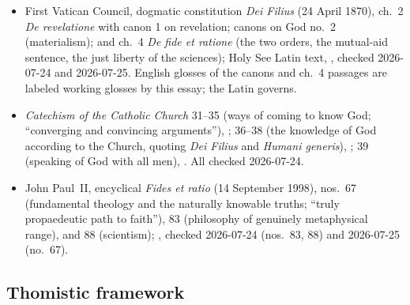 {\fontsize{8.6}{9.6}\selectfont
\begin{itemize}[itemsep=0pt,parsep=0pt,topsep=0.05em]
\item First Vatican Council, dogmatic constitution \emph{Dei Filius} (24 April 1870), ch.~2 \emph{De revelatione} with canon 1 on revelation; canons on God no.~2 (materialism); and ch.~4 \emph{De fide et ratione} (the two orders, the mutual-aid sentence, the just liberty of the sciences); Holy See Latin text, , checked 2026-07-24 and 2026-07-25. English glosses of the canons and ch.~4 passages are labeled working glosses by this essay; the Latin governs.
\item \emph{Catechism of the Catholic Church} 31--35 (ways of coming to know God; ``converging and convincing arguments''), ; 36--38 (the knowledge of God according to the Church, quoting \emph{Dei Filius} and \emph{Humani generis}), ; 39 (speaking of God with all men), . All checked 2026-07-24.
\item John Paul~II, encyclical \emph{Fides et ratio} (14 September 1998), nos.~67 (fundamental theology and the naturally knowable truths; ``truly propaedeutic path to faith''), 83 (philosophy of genuinely metaphysical range), and 88 (scientism); , checked 2026-07-24 (nos.~83, 88) and 2026-07-25 (no.~67).
\end{itemize}}

\subsection*{Thomistic framework}

